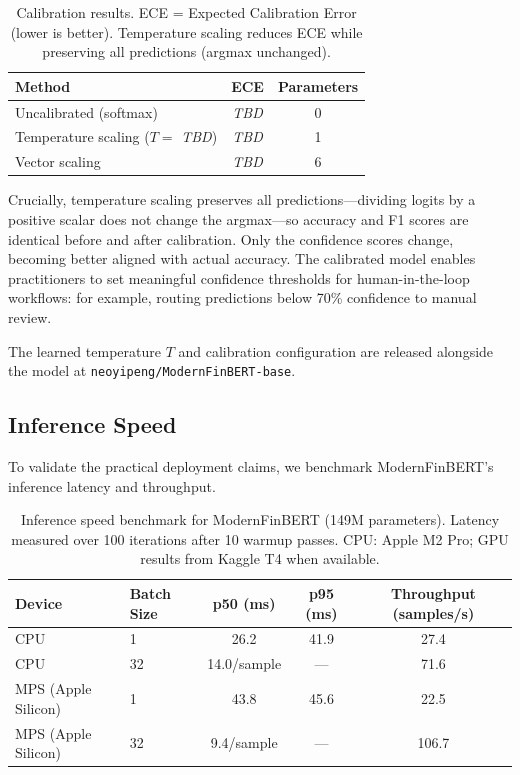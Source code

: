 \documentclass[11pt]{article}
\begin{document}
\begin{table}[h]
\centering
\caption{Calibration results. ECE = Expected Calibration Error (lower is better). Temperature scaling reduces ECE while preserving all predictions (argmax unchanged).}
\label{tab:calibration}
\begin{tabular}{lcc}
\toprule
\textbf{Method} & \textbf{ECE} & \textbf{Parameters} \\
\midrule
Uncalibrated (softmax) & \textit{TBD} & 0 \\
Temperature scaling ($T = $ \textit{TBD}) & \textit{TBD} & 1 \\
Vector scaling & \textit{TBD} & 6 \\
\bottomrule
\end{tabular}
\end{table}

Crucially, temperature scaling preserves all predictions---dividing logits by a positive scalar does not change the argmax---so accuracy and F1 scores are identical before and after calibration. Only the confidence scores change, becoming better aligned with actual accuracy. The calibrated model enables practitioners to set meaningful confidence thresholds for human-in-the-loop workflows: for example, routing predictions below 70\% confidence to manual review.

The learned temperature $T$ and calibration configuration are released alongside the model at \texttt{neoyipeng/ModernFinBERT-base}.

\subsection{Inference Speed}
\label{sec:inference-speed}

To validate the practical deployment claims, we benchmark ModernFinBERT's inference latency and throughput.

\begin{table}[h]
\centering
\caption{Inference speed benchmark for ModernFinBERT (149M parameters). Latency measured over 100 iterations after 10 warmup passes. CPU: Apple M2 Pro; GPU results from Kaggle T4 when available.}
\label{tab:inference-speed}
\begin{tabular}{llccc}
\toprule
\textbf{Device} & \textbf{Batch Size} & \textbf{p50 (ms)} & \textbf{p95 (ms)} & \textbf{Throughput (samples/s)} \\
\midrule
CPU & 1 & 26.2 & 41.9 & 27.4 \\
CPU & 32 & 14.0/sample & --- & 71.6 \\
MPS (Apple Silicon) & 1 & 43.8 & 45.6 & 22.5 \\
MPS (Apple Silicon) & 32 & 9.4/sample & --- & 106.7 \\
\bottomrule
\end{tabular}
\end{table}
\end{document}
